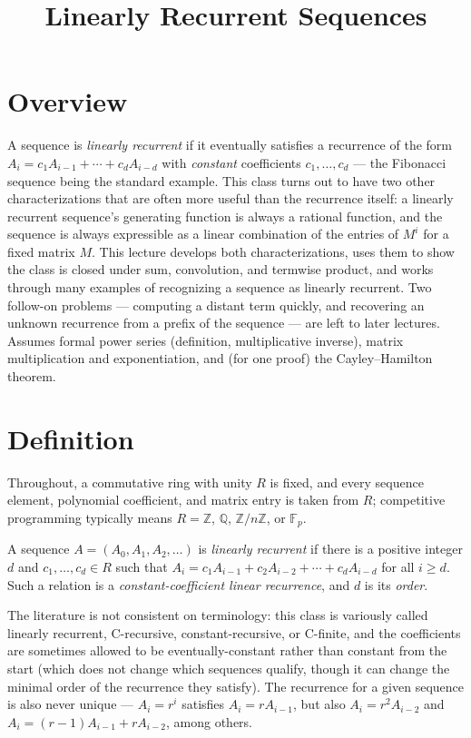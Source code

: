 \documentclass[11pt]{article}
\title{Linearly Recurrent Sequences}
\author{}
\date{}
\begin{document}
\thispagestyle{fancy}


\section{Overview}
A sequence is \emph{linearly recurrent} if it eventually satisfies a
recurrence of the form $A_i = c_1 A_{i-1} + \cdots + c_d A_{i-d}$ with
\emph{constant} coefficients $c_1,\ldots,c_d$ --- the Fibonacci sequence
being the standard example. This class turns out to have two other
characterizations that are often more useful than the recurrence itself:
a linearly recurrent sequence's generating function is always a rational
function, and the sequence is always expressible as a linear combination
of the entries of $M^i$ for a fixed matrix $M$. This lecture develops
both characterizations, uses them to show the class is closed under sum,
convolution, and termwise product, and works through many examples of
recognizing a sequence as linearly recurrent. Two follow-on problems ---
computing a distant term quickly, and recovering an unknown recurrence
from a prefix of the sequence --- are left to later lectures. Assumes
formal power series (definition, multiplicative inverse), matrix
multiplication and exponentiation, and (for one proof) the
Cayley--Hamilton theorem.

\section{Definition}
Throughout, a commutative ring with unity $R$ is fixed, and every
sequence element, polynomial coefficient, and matrix entry is taken from
$R$; competitive programming typically means $R=\mathbb{Z}$,
$\mathbb{Q}$, $\mathbb{Z}/n\mathbb{Z}$, or $\mathbb{F}_p$.

\begin{definitionbox}
A sequence $A=(A_0,A_1,A_2,\ldots)$ is \emph{linearly recurrent} if there
is a positive integer $d$ and $c_1,\ldots,c_d \in R$ such that
$A_i = c_1A_{i-1} + c_2A_{i-2} + \cdots + c_dA_{i-d}$ for all $i \ge d$.
Such a relation is a \emph{constant-coefficient linear recurrence}, and
$d$ is its \emph{order}.
\end{definitionbox}

\begin{notebox}
The literature is not consistent on terminology: this class is variously
called linearly recurrent, C-recursive, constant-recursive, or C-finite,
and the coefficients are sometimes allowed to be eventually-constant
rather than constant from the start (which does not change which
sequences qualify, though it can change the minimal order of the
recurrence they satisfy). The recurrence for a given sequence is also
never unique --- $A_i=r^i$ satisfies $A_i=rA_{i-1}$, but also
$A_i=r^2A_{i-2}$ and $A_i=(r-1)A_{i-1}+rA_{i-2}$, among others.
\end{notebox}
\end{document}
